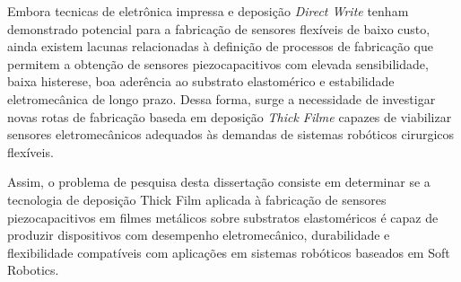 Embora tecnicas de eletrônica impressa e deposição \textit{Direct Write} tenham demonstrado potencial para a fabricação de sensores flexíveis de baixo custo,
ainda existem lacunas relacionadas à definição de processos de fabricação que permitem a obtenção de sensores piezocapacitivos com elevada sensibilidade,
baixa histerese, boa aderência ao substrato elastomérico e estabilidade eletromecânica de longo prazo. Dessa forma, surge a necessidade de investigar novas
rotas de fabricação baseda em deposição \textit{Thick Filme} capazes de viabilizar sensores eletromecânicos adequados às demandas de sistemas robóticos cirurgicos
flexíveis.

Assim, o problema de pesquisa desta dissertação consiste em determinar se a tecnologia de deposição Thick Film aplicada à fabricação de sensores 
piezocapacitivos em filmes metálicos sobre substratos elastoméricos é capaz de produzir dispositivos com desempenho eletromecânico, durabilidade e 
flexibilidade compatíveis com aplicações em sistemas robóticos baseados em Soft Robotics.













